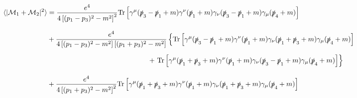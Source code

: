 \begin{solution}
\begin{align*}
    \expval{|\mathcal{M}_1+\mathcal{M}_2|^2} &= \frac{e^4}{4\left[(p_1-p_3)^2-m^2\right]^2} \tr \left[ \gamma^\mu (\pslash_3-\pslash_1 +m) \gamma^\nu (\pslash_1 + m ) \gamma_\nu  (\pslash_3-\pslash_1 +m) \gamma_\mu (\pslash_4 + m ) \right] \\[0.12in]
    &+  \frac{e^4}{4\left[(p_1-p_3)^2-m^2\right]\left[(p_1+p_3)^2-m^2\right]} \left\{ \Tr{\gamma^\mu (\pslash_3-\pslash_1+m) \gamma^\nu (\pslash_1+m) \gamma_\nu (\pslash_1+\pslash_3+m) \gamma_\mu (\pslash_4+m)}  \right. \\[0.08in]
    &\hspace{2.in} + \left. \Tr{    \gamma^\mu  (\pslash_1+\pslash_3+m)  \gamma^\nu   (\pslash_1+m)   \gamma_\nu (\pslash_3-\pslash_1+m) \gamma_\mu   (\pslash_4+m)  }  \right\}  \\[0.12in]
    &+ \frac{e^4}{4\left[(p_1+p_3)^2-m^2\right]^2} \tr \left[ \gamma^\mu (\pslash_1+\pslash_3 +m) \gamma^\nu (\pslash_1 + m ) \gamma_\nu  (\pslash_1+\pslash_3 +m) \gamma_\mu (\pslash_4 + m ) \right] 
\end{align*}
\end{solution}



